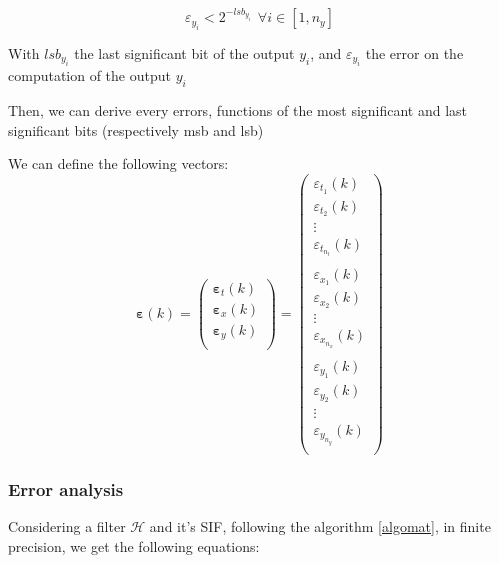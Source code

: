 	\begin{equation} \label{condition}
		\varepsilon_{y_i} < 2^{-lsb_{y_i}} \hspace{5pt} \forall i \in [1,n_y]
	\end{equation}

	With $lsb_{y_i}$ the last significant bit of the output $y_i$, and $\varepsilon_{y_i}$ the error on the computation of the output $y_i$

	Then, we can derive every errors, functions of the most significant and last significant bits (respectively msb and lsb)

	We can define the following vectors:
	\begin{equation}
		\boldsymbol{\varepsilon}(k) =
		\begin{pmatrix}
			\boldsymbol{\varepsilon}_t(k) \\
			\boldsymbol{\varepsilon}_x(k) \\
			\boldsymbol{\varepsilon}_y(k) \\
		\end{pmatrix}
		=
		\begin{pmatrix}
			{\varepsilon}_{t_1}(k) \\
			{\varepsilon}_{t_2}(k) \\
			\vdots \\
			{\varepsilon}_{t_{n_t}}(k) \\
			\hspace{5pt} \\
			{\varepsilon}_{x_1}(k) \\
			{\varepsilon}_{x_2}(k) \\
			\vdots \\
			{\varepsilon}_{x_{n_x}}(k) \\
			\hspace{5pt} \\
			{\varepsilon}_{y_1}(k) \\
			{\varepsilon}_{y_2}(k) \\
			\vdots \\
			{\varepsilon}_{y_{n_y}}(k) \\
		\end{pmatrix}
	\end{equation}


		
	\subsubsection{Error analysis}

	Considering a filter $\mathcal{H}$ and it’s SIF, following
	the algorithm \ref{algomat}, in finite precision, we get the following equations:


